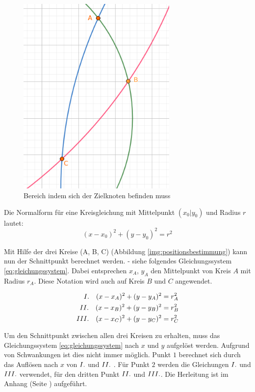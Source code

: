 \begin{figure}[H]
        \centering
        \includegraphics[width=0.7\textwidth]{images/positionsbestimmung_flaeche.png}
        \caption{Bereich indem sich der Zielknoten befinden muss}
        \label{img:schwankungen}
\end{figure}

Die Normalform für eine Kreisgleichung mit Mittelpunkt $(x_{0}|y_{0})$ und Radius $r$ lautet:
\begin{equation}
(x-x_{0})^{2}+(y-y_{0})^{2} = r^{2}
\end{equation}

Mit Hilfe der drei Kreise (A, B, C) (Abbildung \ref{img:positionsbestimmung}) kann nun der Schnittpunkt berechnet werden. - siehe folgendes Gleichungssystem \ref{eq:gleichungssystem}. Dabei entsprechen $x_{A}$, $y_{A}$ den Mittelpunkt von Kreis $A$ mit Radius $r_{A}$. Diese Notation wird auch auf Kreis $B$ und $C$ angewendet.

\begin{equation} \label{eq:gleichungssystem}
\begin{split}
\RM{1} \quad (x-x_{A})^{2}+(y-y_{A})^{2} &= r_{A}^{2} \\
\RM{2} \quad (x-x_{B})^{2}+(y-y_{B})^{2} &= r_{B}^{2} \\
\RM{3} \quad (x-x_{C})^{2}+(y-y_{C})^{2} &= r_{C}^{2}
\end{split}
\end{equation}

Um den Schnittpunkt zwischen allen drei Kreisen zu erhalten, muss das Gleichungssystem \ref{eq:gleichungssystem} nach $x$ und $y$ aufgelöst werden. Aufgrund von Schwankungen ist dies nicht immer möglich. Punkt $1$ berechnet sich durch das Auflösen nach $x$ von $\RM{1}$ und $\RM{2}$ . Für Punkt $2$ werden die Gleichungen $\RM{1}$ und $\RM{3}$ verwendet, für den dritten Punkt $\RM{2}$ und $\RM{3}$. Die Herleitung ist im Anhang (Seite \pageref{sec:abcdef}) aufgeführt.

